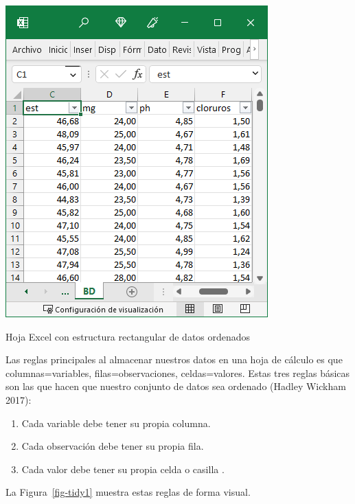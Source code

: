 \documentclass[
  letterpaper,
  DIV=11,
  numbers=noendperiod,
  oneside]{scrreprt}
\providecommand{\tightlist}{%
  \setlength{\itemsep}{0pt}\setlength{\parskip}{0pt}}\usepackage{longtable,booktabs,array}
\begin{document}
\begin{marginfigure}

{\centering \includegraphics{01-imagenes/2023-01-20.png}

}

\caption{\label{fig-excel-camembert}Hoja Excel con estructura
rectangular de datos ordenados}

\end{marginfigure}

Las reglas principales al almacenar nuestros datos en una hoja de
cálculo es que columnas=variables, filas=observaciones, celdas=valores.
Estas tres reglas básicas son las que hacen que nuestro conjunto de
datos sea ordenado (Hadley Wickham 2017):

\begin{enumerate}
\def\labelenumi{\arabic{enumi}.}
\tightlist
\item
  Cada variable debe tener su propia columna.
\item
  Cada observación debe tener su propia fila.
\item
  Cada valor debe tener su propia celda o casilla .
\end{enumerate}

La Figura~\ref{fig-tidy1} muestra estas reglas de forma visual.
\end{document}
